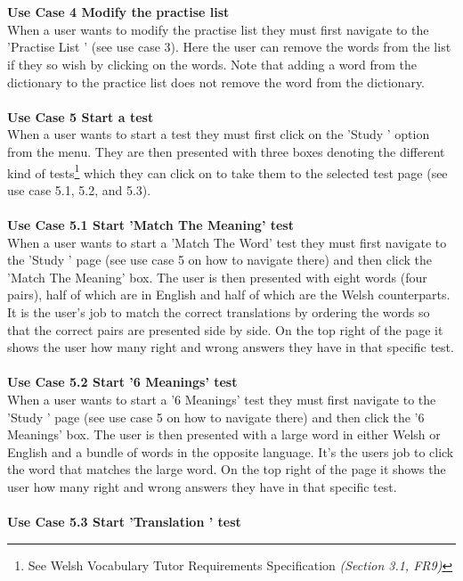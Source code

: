 \documentclass{project}
\newcommand*{\icon}[1]{%
  \raisebox{-.3\baselineskip}{%
    \texttt{[image: \#1]}%
  }%
}
\begin{document}
\\\\
\textbf{Use Case 4 Modify the practise list}
\\
When a user wants to modify the practise list they must first navigate to the 'Practise List \icon{practise-icon}' (see use case 3). Here the user can remove the words from the list if they so wish by clicking on the words. Note that adding a word from the dictionary to the practice list does not remove the word from the dictionary.
\\\\
\textbf{Use Case 5 Start a test}
\\
When a user wants to start a test they must first click on the 'Study \icon{study-icon}' option from the menu. They are then presented with three boxes denoting the different kind of tests\footnote{See Welsh Vocabulary Tutor Requirements Specification\cite{se.qa.csrs} \textit{(Section 3.1, FR9)}} which they can click on to take them to the selected test page (see use case 5.1, 5.2, and 5.3).
\\\\
\textbf{Use Case 5.1 Start 'Match The Meaning' test}
\\
When a user wants to start a 'Match The Word' test they must first navigate to the 'Study \icon{study-icon}' page (see use case 5 on how to navigate there) and then click the 'Match The Meaning' box. The user is then presented with eight words (four pairs), half of which are in English and half of which are the Welsh counterparts. It is the user's job to match the correct translations by ordering the words so that the correct pairs are presented side by side. On the top right of the page it shows the user how many right and wrong answers they have in that specific test.
\\\\
\textbf{Use Case 5.2 Start '6 Meanings' test}
\\
When a user wants to start a '6 Meanings' test they must first navigate to the 'Study \icon{study-icon}' page (see use case 5 on how to navigate there) and then click the '6 Meanings' box. The user is then presented with a large word in either Welsh or English and a bundle of words in the opposite language. It's the users job to click the word that matches the large word. On the top right of the page it shows the user how many right and wrong answers they have in that specific test.
\\\\
\textbf{Use Case 5.3 Start 'Translation ' test}
\end{document}
